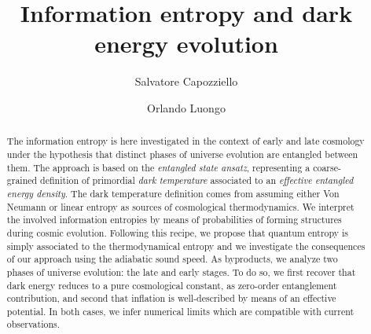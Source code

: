 \documentclass[nofootinbib,prd,superscriptaddress,showpacs,showkeys,]{revtex4}
\begin{document}
\title{Information entropy and dark energy evolution}

\author{Salvatore Capozziello}

\author{Orlando Luongo}



\begin{abstract}
The information entropy is here investigated in the context of early and late cosmology under the hypothesis that distinct phases of universe evolution are entangled between them. The approach is based on the \emph{entangled state ansatz},  representing  a coarse-grained definition of primordial \emph{dark temperature} associated to an \emph{effective entangled energy density}. The dark temperature definition comes from assuming either Von Neumann or linear entropy as sources of cosmological thermodynamics. We interpret the involved information entropies by means of probabilities of forming structures during cosmic evolution. Following this recipe, we propose that  quantum entropy is simply associated to the thermodynamical entropy and we investigate the consequences of our approach using the adiabatic sound speed. As  byproducts, we analyze two phases of universe evolution: the late and early stages. To do so, we first recover that dark energy reduces to a pure cosmological constant, as zero-order entanglement contribution, and second that inflation is well-described  by means of an effective potential. In both cases, we infer numerical limits which are compatible with current observations.
\end{abstract}


\end{document}

